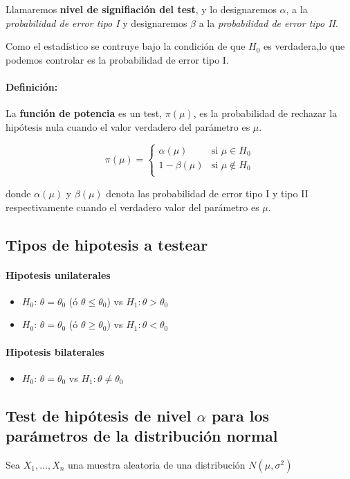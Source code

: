 Llamaremos \textbf{nivel de signifiación del test}, y lo designaremos $\alpha$, a la \textit{probabilidad de error tipo I} y designaremos $\beta$ a la \textit{probabilidad de error tipo II}.

Como el estadístico se contruye bajo la condición de que $H_0$ es verdadera,lo que podemos controlar es la probabilidad de error tipo I.

\paragraph{Definición:} La \textbf{función de potencia} es un test, $\pi(\mu)$, es la probabilidad de rechazar la hipótesis nula cuando el valor verdadero del parámetro es $\mu$.

$$\pi(\mu) = \left\{\begin{array}{ll}
\alpha(\mu) & \text{si } \mu\in H_0 \\
1 - \beta(\mu) & \text{si } \mu\notin H_0 \\
\end{array}\right.$$

donde $\alpha(\mu)$ y $\beta(\mu)$ denota las probabilidad de error tipo I y tipo II respectivamente cuando el verdadero valor del parámetro es $\mu$.

\subsection{Tipos de hipotesis a testear}
\paragraph{Hipotesis unilaterales}
\begin{itemize}
\item $H_0$: $\theta = \theta_0$ (ó $\theta \leq \theta_0$) vs  $H_1: \theta > \theta_0$
\item $H_0$: $\theta = \theta_0$ (ó $\theta \geq \theta_0$) vs  $H_1: \theta < \theta_0$
\end{itemize}

\paragraph{Hipotesis bilaterales}
\begin{itemize}
	\item $H_0$: $\theta = \theta_0$ vs  $H_1: \theta \neq \theta_0$
\end{itemize}

\subsection{Test de hipótesis de nivel \texorpdfstring{$\alpha$}{alfa} para los parámetros de la distribución normal}
Sea $X_1,\dots,X_n$ una muestra aleatoria de una distribución $N(\mu,\sigma^2)$

